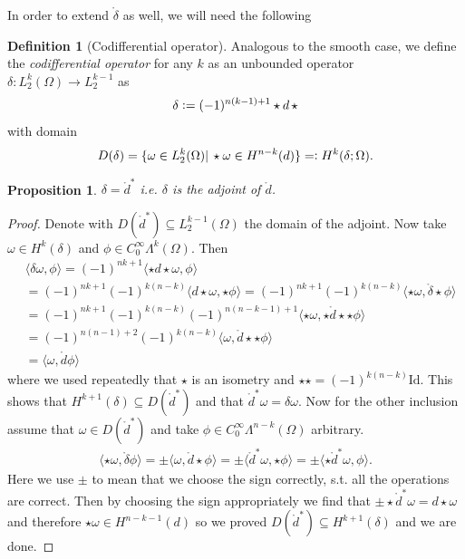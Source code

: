 \documentclass[12pt,a4paper]{article}
\numberwithin{equation}{subsection}
\numberwithin{lemma}{subsection}
\newtheorem{proposition}[lemma]{Proposition}
\theoremstyle{definition}
\newtheorem{definition}[lemma]{Definition}
\newcommand{\smoothcompforms}[2]{C_0^\infty \Lambda^{#1}(#2)}
\begin{document}
In order to extend $\mathring{\delta}$ as well, we will need the following

\begin{definition}[Codifferential operator]
    Analogous to the smooth case, 
    we define the \textit{codifferential operator} for any $k$ as an unbounded
    operator $\delta: L^k_2(\Omega) \rightarrow L^{k-1}_2$ as
    \begin{align*}
        \delta \vcentcolon= (-1)^{n(k-1)+1}\star d\,\star
    \end{align*}
    with domain
    \begin{align*}
        D(\delta) = \{ \omega \in L^k_2(\Omega) | \,
        \star\omega \in H^{n-k}(d) \} 
        =\vcentcolon H^k(\delta; \Omega).
    \end{align*}
\end{definition}

\begin{proposition}
    $\delta = \mathring{d}^*$ i.e. $\delta$ is the adjoint of $\mathring{d}$.
\end{proposition}
\begin{proof}
    Denote with
    $D(\mathring{d}^*) \subseteq L_2^{k-1}(\Omega)$ the domain of the adjoint.
    Now take $\omega \in H^k(\delta)$ and $\phi \in 
    \smoothcompforms{k}{\Omega}$.
    Then 
    \begin{align*}
        &\langle \delta \omega, \phi \rangle = 
        (-1)^{nk+1} \langle \star d\star \omega, \phi \rangle \\  
        &= (-1)^{nk+1} (-1)^{k(n-k)} \langle d\star \omega, \star\phi \rangle =
        (-1)^{nk+1} (-1)^{k(n-k)} 
            \langle \star \omega, \mathring{\delta}\star\phi \rangle \\
        &= (-1)^{nk+1} (-1)^{k(n-k)} (-1)^{n(n-k-1)+1}
            \langle \star \omega, \star\mathring{d}\star\star\phi \rangle \\
        &=(-1)^{n(n-1)+2} (-1)^{k(n-k)} \langle \omega, 
            \mathring{d}\star\star\phi \rangle\\
        &= \langle \omega, \mathring{d}\phi \rangle
    \end{align*}
    where we used repeatedly that $\star$ is an isometry and 
    $\star\star = (-1)^{k(n-k)}\text{Id}$. 
    This shows that $H^{k+1}(\delta) \subseteq 
    D(\mathring{d}^*)$ and that $\mathring{d}^* \omega = \delta \omega$. Now for 
    the other inclusion assume that $\omega \in D(\mathring{d}^*)$ and take 
    $\phi \in \smoothcompforms{n-k}{\Omega}$ arbitrary.
    \begin{align*}
        \langle \star\omega, \mathring{\delta}\phi \rangle = \pm 
        \langle \omega, \mathring{d}\star\phi \rangle = 
        \pm \langle \mathring{d}^* \omega, \star\phi \rangle = 
        \pm \langle \star\mathring{d}^* \omega, \phi \rangle.
    \end{align*} 
    Here we use $\pm$ to mean that we choose the sign correctly, s.t. all the
    operations are correct. Then by choosing the sign appropriately we find that
    $ \pm \star\mathring{d}^* \omega = d\star\omega$ and therefore 
    $\star\omega \in H^{n-k-1}(d)$ so we proved $D(\mathring{d}^*) \subseteq 
    H^{k+1}(\delta)$ and we are done.    
\end{proof}
\end{document}

